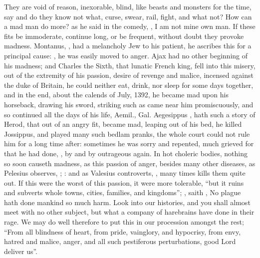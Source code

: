 They are void of reason, inexorable, blind, like beasts and monsters for the
time, say and do they know not what, curse, swear, rail, fight, and what not?
How can a mad man do more? as he said in the comedy,
, I am not mine own man. If
these fits be immoderate, continue long, or be frequent, without doubt they
provoke madness. Montanus, , had a melancholy
Jew to his patient, he ascribes this for a principal cause: , he was easily moved to anger. Ajax had no other beginning
of his madness; and Charles the Sixth, that lunatic French king, fell into this
misery, out of the extremity of his passion, desire of revenge and malice,
incensed against the duke of Britain, he could neither
eat, drink, nor sleep for some days together, and in the end, about the calends
of July, 1392, he became mad upon his horseback, drawing his sword, striking
such as came near him promiscuously, and so continued all the days of his life,
Aemil.,  Gal. 
Aegesippus , hath such
a story of Herod, that out of an angry fit, became mad,
leaping out of his bed, he killed Jossippus, and played
many such bedlam pranks, the whole court could not rule him for a long time
after: sometimes he was sorry and repented, much grieved for that he had done,
, by and by outrageous again. In hot choleric
bodies, nothing so soon causeth madness, as this passion of anger, besides many
other diseases, as Pelesius observes, ; : and as
Valesius controverts, , many times kills them quite out. If this were the worst of
this passion, it were more tolerable, \enquote{but it ruins and
subverts whole towns, cities, families, and kingdoms};
, saith \Seneca{},
 No plague hath done mankind so much
harm. Look into our histories, and you shall almost meet with no other subject,
but what a company of harebrains have done in their rage.
We may do well therefore to put this in our procession amongst the rest; \enquote{From
all blindness of heart, from pride, vainglory, and hypocrisy, from envy, hatred
and malice, anger, and all such pestiferous perturbations, good Lord deliver
us}.

